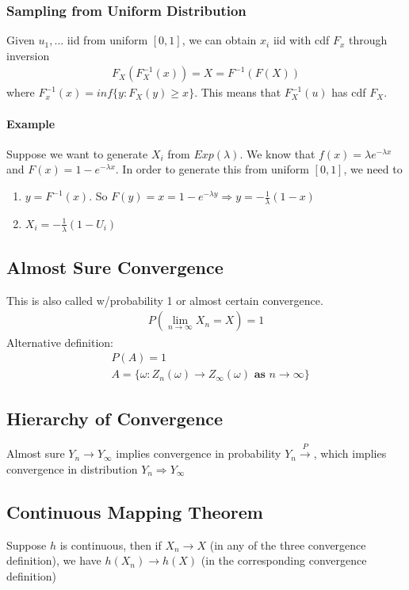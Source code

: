 \subsubsection{Sampling from Uniform Distribution}
Given $u_1, ...$ iid from uniform $[0,1]$, we can obtain $x_i$ iid with cdf $F_x$ through inversion 
    \begin{align*}
    F_X(F_X^{-1}(x)) = X = F^{-1}(F(X))
    \end{align*}
where $F_x^{-1}(x) = inf \{ y: F_X(y) \geq x \}$. This means that $F_X^{-1}(u)$ has cdf $F_X$. 

\paragraph{Example}
Suppose we want to generate $X_i$ from $Exp(\lambda)$. We know that $f(x) = \lambda e^{-\lambda x}$ and $F(x) = 1 - e^{-\lambda x}$. In order to generate this from uniform $[0,1]$, we need to 
    \begin{enumerate}
        \item $y = F^{-1}(x)$. So $F(y) = x = 1 - e^{-\lambda y} \Longrightarrow y= -\frac{1}{\lambda}(1-x)$
        \item $X_i = -\frac{1}{\lambda} (1-U_i)$
        
    \end{enumerate}


\subsection{Almost Sure Convergence}
This is also called w/probability 1 or almost certain convergence.  
    \begin{align*}
    P(\lim_{n \to \infty} X_n = X) = 1
    \end{align*}
Alternative definition: 
    \begin{align*}
        & P(A) = 1 \\
        & A = \{ \omega: Z_n(\omega) \to Z_\infty(\omega) \textbf{ as } n \to \infty \} 
    \end{align*}


\subsection{Hierarchy of Convergence}
Almost sure $Y_n \to Y_\infty$ implies convergence in probability $Y_n \overset{P}{\to}$, which implies convergence in distribution $Y_n \Rightarrow Y_\infty$

\subsection{Continuous Mapping Theorem} 
Suppose $h$ is continuous, then if $X_n \to X$ (in any of the three convergence definition), we have $h(X_n) \to h(X)$ (in the corresponding convergence definition) 



